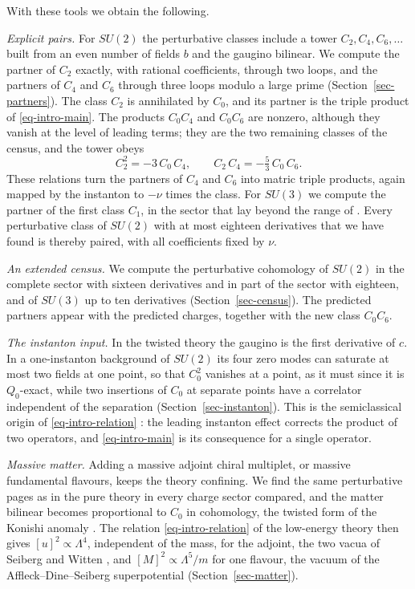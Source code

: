 \documentclass[11pt]{article}
\numberwithin{equation}{section}
\numberwithin{figure}{section}
\numberwithin{table}{section}
\theoremstyle{definition}
\begin{document}
With these tools we obtain the following.

\emph{Explicit pairs.} For $SU(2)$ the perturbative classes include a tower $C_2,C_4,C_6,\dots$ built from an even number of fields $b$ and the gaugino bilinear. We compute the partner of $C_2$ exactly, with rational coefficients, through two loops, and the partners of $C_4$ and $C_6$ through three loops modulo a large prime (Section~\ref{sec-partners}). The class $C_2$ is annihilated by $C_0$, and its partner is the triple product of \eqref{eq-intro-main}. The products $C_0C_4$ and $C_0C_6$ are nonzero, although they vanish at the level of leading terms; they are the two remaining classes of the census, and the tower obeys
\begin{equation}\label{eq-intro-products}
C_2^2=-3\,C_0\,C_4,\qquad C_2\,C_4=-\tfrac53\,C_0\,C_6 .
\end{equation}
These relations turn the partners of $C_4$ and $C_6$ into matric triple products, again mapped by the instanton to $-\nu$ times the class. For $SU(3)$ we compute the partner of the first class $C_1$, in the sector that lay beyond the range of \cite{semichiral}. Every perturbative class of $SU(2)$ with at most eighteen derivatives that we have found is thereby paired, with all coefficients fixed by $\nu$.

\emph{An extended census.} We compute the perturbative cohomology of $SU(2)$ in the complete sector with sixteen derivatives and in part of the sector with eighteen, and of $SU(3)$ up to ten derivatives (Section~\ref{sec-census}). The predicted partners appear with the predicted charges, together with the new class $C_0C_6$.

\emph{The instanton input.} In the twisted theory the gaugino is the first derivative of $c$. In a one-instanton background of $SU(2)$ its four zero modes can saturate at most two fields at one point, so that $C_0^2$ vanishes at a point, as it must since it is $Q_0$-exact, while two insertions of $C_0$ at separate points have a correlator independent of the separation (Section~\ref{sec-instanton}). This is the semiclassical origin of \eqref{eq-intro-relation} \cite{NSVZ}: the leading instanton effect corrects the product of two operators, and \eqref{eq-intro-main} is its consequence for a single operator.

\emph{Massive matter.} Adding a massive adjoint chiral multiplet, or massive fundamental flavours, keeps the theory confining. We find the same perturbative pages as in the pure theory in every charge sector compared, and the matter bilinear becomes proportional to $C_0$ in cohomology, the twisted form of the Konishi anomaly \cite{Konishi}. The relation \eqref{eq-intro-relation} of the low-energy theory then gives $[u]^2\propto\Lambda^4$, independent of the mass, for the adjoint, the two vacua of Seiberg and Witten \cite{SW}, and $[M]^2\propto\Lambda^5/m$ for one flavour, the vacuum of the Affleck--Dine--Seiberg superpotential \cite{ADS} (Section~\ref{sec-matter}).
\end{document}
